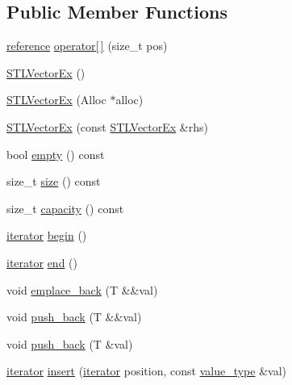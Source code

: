 \subsection*{Public Member Functions}
\begin{DoxyCompactItemize}
\item 
\mbox{\hyperlink{classnabla_1_1_s_t_l_vector_ex_a6adf5d87234352c139af2d48f4787ed5}{reference}} \mbox{\hyperlink{classnabla_1_1_s_t_l_vector_ex_afde528e33bdf0672764cc4047609461f}{operator\mbox{[}$\,$\mbox{]}}} (size\+\_\+t pos)
\item 
\mbox{\hyperlink{classnabla_1_1_s_t_l_vector_ex_ac83be23a58d069f67572216c27307472}{S\+T\+L\+Vector\+Ex}} ()
\item 
\mbox{\hyperlink{classnabla_1_1_s_t_l_vector_ex_a271e7d8d10dd9371c08a1a0e6f7f8c27}{S\+T\+L\+Vector\+Ex}} (Alloc $\ast$alloc)
\item 
\mbox{\hyperlink{classnabla_1_1_s_t_l_vector_ex_a806b14a4669228eac919caa37fcf9b75}{S\+T\+L\+Vector\+Ex}} (const \mbox{\hyperlink{classnabla_1_1_s_t_l_vector_ex}{S\+T\+L\+Vector\+Ex}} \&rhs)
\item 
bool \mbox{\hyperlink{classnabla_1_1_s_t_l_vector_ex_a4f7dc09d999e0d82fae18a2d7fb4c1e8}{empty}} () const
\item 
size\+\_\+t \mbox{\hyperlink{classnabla_1_1_s_t_l_vector_ex_a1b4a4d968613137772046331b1264e1f}{size}} () const
\item 
size\+\_\+t \mbox{\hyperlink{classnabla_1_1_s_t_l_vector_ex_a44ff1b69309686b9b3f1ea125982b078}{capacity}} () const
\item 
\mbox{\hyperlink{classnabla_1_1_s_t_l_vector_ex_a4bd3bc9bbe369d76e958f3180c22f40b}{iterator}} \mbox{\hyperlink{classnabla_1_1_s_t_l_vector_ex_a01d7928bf1a4aa33e6e147df5c9a2f63}{begin}} ()
\item 
\mbox{\hyperlink{classnabla_1_1_s_t_l_vector_ex_a4bd3bc9bbe369d76e958f3180c22f40b}{iterator}} \mbox{\hyperlink{classnabla_1_1_s_t_l_vector_ex_ad7749220f425a7c8393c2896aa47e029}{end}} ()
\item 
void \mbox{\hyperlink{classnabla_1_1_s_t_l_vector_ex_a66394a10b1e5e1a5bbe0cfa6198a48f8}{emplace\+\_\+back}} (T \&\&val)
\item 
void \mbox{\hyperlink{classnabla_1_1_s_t_l_vector_ex_a8fde5302f3fc7dd24a77b24c4acb9ecb}{push\+\_\+back}} (T \&\&val)
\item 
void \mbox{\hyperlink{classnabla_1_1_s_t_l_vector_ex_a51ca7d80dcc58e01075f6d1b2eb24f81}{push\+\_\+back}} (T \&val)
\item 
\mbox{\hyperlink{classnabla_1_1_s_t_l_vector_ex_a4bd3bc9bbe369d76e958f3180c22f40b}{iterator}} \mbox{\hyperlink{classnabla_1_1_s_t_l_vector_ex_abc8284cabd99f5a4ba0fc971e98630ab}{insert}} (\mbox{\hyperlink{classnabla_1_1_s_t_l_vector_ex_a4bd3bc9bbe369d76e958f3180c22f40b}{iterator}} position, const \mbox{\hyperlink{classnabla_1_1_s_t_l_vector_ex_a6af5809443fb78a0fe7321ff93e2ad4c}{value\+\_\+type}} \&val)

\end{DoxyCompactItemize}
